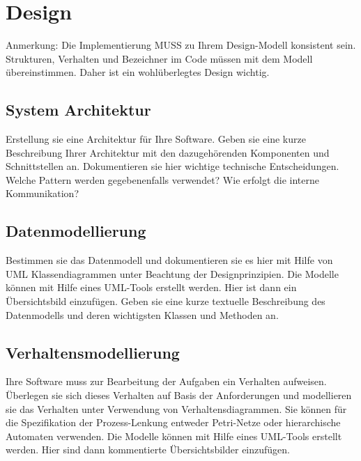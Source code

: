 \chapter{Design}

Anmerkung: Die Implementierung MUSS zu Ihrem Design-Modell konsistent
sein. Strukturen, Verhalten und Bezeichner im Code müssen mit dem Modell
übereinstimmen. Daher ist ein wohlüberlegtes Design wichtig.

\section{System Architektur}

Erstellung sie eine Architektur für Ihre Software. Geben sie eine kurze
Beschreibung Ihrer Architektur mit den dazugehörenden Komponenten und
Schnittstellen an. Dokumentieren sie hier wichtige technische
Entscheidungen. Welche Pattern werden gegebenenfalls verwendet? Wie
erfolgt die interne Kommunikation?

\section{Datenmodellierung}

Bestimmen sie das Datenmodell und dokumentieren sie es hier mit Hilfe
von UML Klassendiagrammen unter Beachtung der Designprinzipien. Die
Modelle können mit Hilfe eines UML-Tools erstellt werden. Hier ist dann
ein Übersichtsbild einzufügen.
Geben sie eine kurze textuelle Beschreibung des Datenmodells und deren
wichtigsten Klassen und Methoden an.

\section{Verhaltensmodellierung}

Ihre Software muss zur Bearbeitung der Aufgaben ein Verhalten aufweisen.
Überlegen sie sich dieses Verhalten auf Basis der Anforderungen und
modellieren sie das Verhalten unter Verwendung von Verhaltensdiagrammen.
Sie können für die Spezifikation der Prozess-Lenkung entweder
Petri-Netze oder hierarchische Automaten verwenden. Die Modelle können
mit Hilfe eines UML-Tools erstellt werden. Hier sind dann kommentierte
Übersichtsbilder einzufügen.

